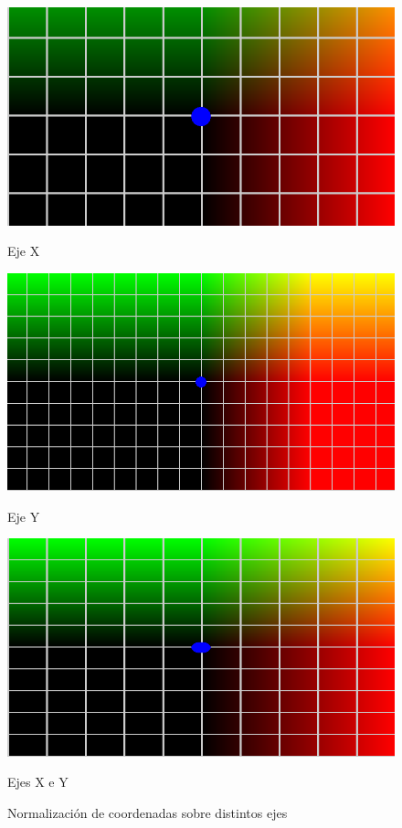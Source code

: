 \begin{figure}[htbp]
    \centering
    \begin{minipage}[b]{0.45\textwidth}
        \centering
        \includegraphics[width=\textwidth]{Plantilla-TFG-master/img/normX.png}
        \caption{Eje X}
    \end{minipage}
    \hfill
    \begin{minipage}[b]{0.45\textwidth}
        \centering
        \includegraphics[width=\textwidth]{Plantilla-TFG-master/img/normY.png}
        \caption{Eje Y}
    \end{minipage}
    
    \medskip
    
    \begin{minipage}[b]{0.45\textwidth}
        \centering
        \includegraphics[width=\textwidth]{Plantilla-TFG-master/img/normXY.png}
        \caption{Ejes X e Y}
    \end{minipage}
    
    \caption{Normalización de coordenadas sobre distintos ejes}
    \label{fig:uv}
\end{figure}


